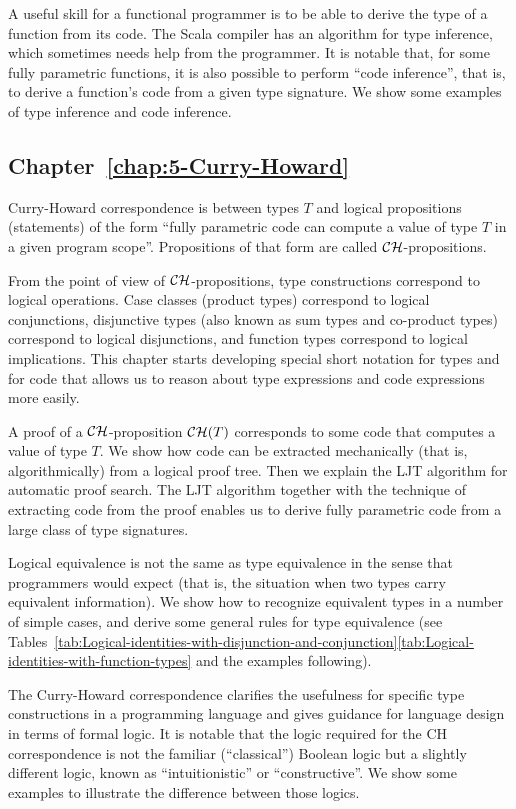 A useful skill for a functional programmer is to be able to derive
the type of a function from its code. The Scala compiler has an algorithm
for type inference, which sometimes needs help from the programmer.
It is notable that, for some fully parametric functions, it is also
possible to perform \textsf{``}code inference\textsf{''}, that is, to derive a function\textsf{'}s
code from a given type signature. We show some examples of type inference
and code inference.

\subsection{Chapter~\ref{chap:5-Curry-Howard}}

Curry-Howard correspondence is between types $T$ and logical propositions
(statements) of the form \textsf{``}fully parametric code can compute a value
of type $T$ in a given program scope\textsf{''}. Propositions of that form
are called ${\cal CH}$-propositions.

From the point of view of ${\cal CH}$-propositions, type constructions
correspond to logical operations. Case classes (product types) correspond
to logical conjunctions, disjunctive types (also known as sum types
and co-product types) correspond to logical disjunctions, and function
types correspond to logical implications. This chapter starts developing
special short notation for types and for code that allows us to reason
about type expressions and code expressions more easily.

A proof of a ${\cal CH}$-proposition ${\cal CH}(T)$ corresponds
to some code that computes a value of type $T$. We show how code
can be extracted mechanically (that is, algorithmically) from a logical
proof tree. Then we explain the LJT algorithm for automatic proof
search. The LJT algorithm together with the technique of extracting
code from the proof enables us to derive fully parametric code from
a large class of type signatures.

Logical equivalence is not the same as type equivalence in the sense
that programmers would expect (that is, the situation when two types
carry equivalent information). We show how to recognize equivalent
types in a number of simple cases, and derive some general rules for
type equivalence (see Tables~\ref{tab:Logical-identities-with-disjunction-and-conjunction}\textendash \ref{tab:Logical-identities-with-function-types}
and the examples following).

The Curry-Howard correspondence clarifies the usefulness for specific
type constructions in a programming language and gives guidance for
language design in terms of formal logic. It is notable that the logic
required for the CH correspondence is not the familiar (\textsf{``}classical\textsf{''})
Boolean logic but a slightly different logic, known as \textsf{``}intuitionistic\textsf{''}
or \textsf{``}constructive\textsf{''}. We show some examples to illustrate the difference
between those logics.

